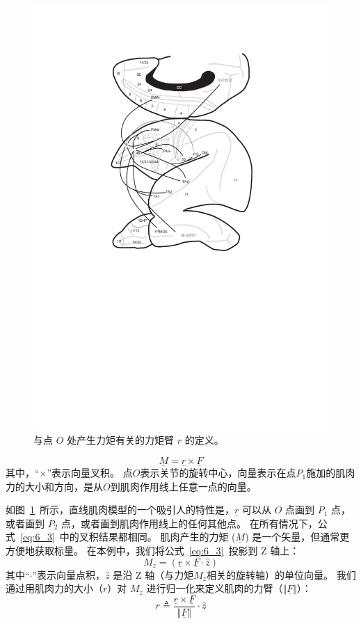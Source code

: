 \begin{figure}[!htb]
	\centering
	\includegraphics[width=0.9\linewidth]{chap6/6_2}
	\caption{与点 $O$ 处产生力矩有关的力矩臂 $r$ 的定义。 \label{fig:6_2}}
\end{figure}


\begin{equation}
	\underline{M} = \underline{r} \times \underline{F}
	\label{eq:6_3}
\end{equation}
%
其中，“$\times$”表示向量叉积。
点$O$表示关节的旋转中心，向量表示在点$P_1$施加的肌肉力的大小和方向，是从$O$到肌肉作用线上任意一点的向量。


如图~\ref{fig:6_2}~所示，直线肌肉模型的一个吸引人的特性是，$\underline{r}$ 可以从 $O$ 点画到 $P_1$ 点，或者画到 $P_2$ 点，或者画到肌肉作用线上的任何其他点。
在所有情况下，公式~\ref{eq:6_3}~中的叉积结果都相同。
肌肉产生的力矩 ($\underline{M}$) 是一个矢量，但通常更方便地获取标量。
在本例中，我们将公式~\ref{eq:6_3}~投影到 Z 轴上：
%
\begin{equation}
	M_z = ( \underline{r} \times \underline{F} \cdot \hat{z} )
	\label{eq:6_4}
\end{equation}
%
其中“$\cdot$”表示向量点积，$\hat{z}$ 是沿 Z 轴（与力矩$M_z$相关的旋转轴）的单位向量。
我们通过用肌肉力的大小（$r$）对 $M_z$ 进行归一化来定义肌肉的力臂（$ \Vert \underline{F} \Vert $）：
%
\begin{equation}
	r \triangleq 
		\frac{
			\underline{r} \times \underline{F}
		}{
			\Vert \underline{F} \Vert
		}
		\cdot
		\hat{z}
	\label{eq:6_5}
\end{equation}


